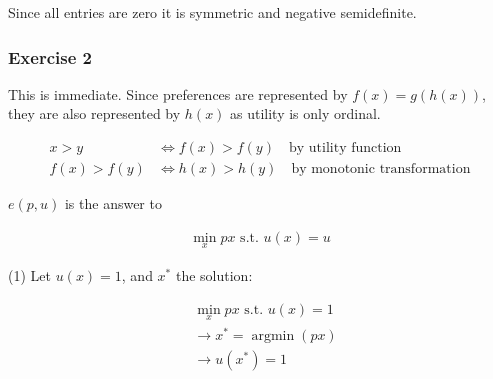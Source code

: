 {\begin{enumerate}[label=(\alph*)]
{Since all entries are zero it is symmetric and negative semidefinite.
}
\end{enumerate}

\subsubsection*{Exercise 2}

\begin{enumerate}[label=(\alph*)]
{\item 
This is immediate. Since preferences are represented by $f(x)=g(h(x))$, they are also represented by $h(x)$ as utility is only ordinal.

\begin{align*}
    x>y &\Longleftrightarrow f(x)>f(y) \quad \text{by utility function} \\
    f(x)>f(y) &\Longleftrightarrow h(x)>h(y) \quad \text{by monotonic transformation}
\end{align*}
}
{\item 
$e(p, u)$ is the answer to

\begin{align*}
    \min_x p x \text{ s.t. } u(x)=u
\end{align*}


(1) Let $u(x)=1$, and $x^*$ the solution: 

\begin{align*}
    &\min_x p x \text{ s.t. } u(x)=1 \\
    &\longrightarrow x^*=\operatorname{argmin}(p x) \\
    &\longrightarrow u\left(x^*\right)=1
\end{align*}
}
\end{enumerate}
}


